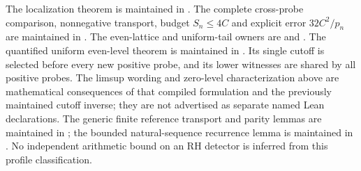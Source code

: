 \documentclass[11pt]{article}
\theoremstyle{definition}
\begin{document}
\begin{sloppypar}
The localization theorem is maintained in
.
The complete cross-probe comparison, nonnegative transport, budget
$S_n\le4C$ and explicit error $32C^2/p_n$ are maintained in
.
The even-lattice and uniform-tail owners are
 and
.
The quantified uniform even-level theorem is maintained in
.
Its single cutoff is selected before every new positive probe,
and its lower witnesses are shared by all positive probes.
The limsup wording and zero-level characterization above are
mathematical consequences of that compiled formulation and the
previously maintained cutoff inverse; they are not advertised as
separate named Lean declarations.
The generic finite reference transport and parity lemmas are maintained
in ;
the bounded natural-sequence recurrence lemma is maintained in
.
No independent arithmetic bound on an RH detector is inferred from
this profile classification.
\end{sloppypar}
\end{document}
